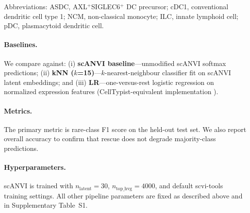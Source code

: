 Abbreviations: ASDC, AXL$^+$SIGLEC6$^+$ DC precursor; cDC1, conventional dendritic cell type 1; NCM, non-classical monocyte; ILC, innate lymphoid cell; pDC, plasmacytoid dendritic cell.

\paragraph{Baselines.} We compare against: (i) \textbf{scANVI baseline}---unmodified scANVI softmax predictions; (ii) \textbf{kNN ($k$=15)}---$k$-nearest-neighbour classifier fit on scANVI latent embeddings; and (iii) \textbf{LR}---one-versus-rest logistic regression on normalized expression features (CellTypist-equivalent implementation \citep{dominguez2022cross}).

\paragraph{Metrics.} The primary metric is rare-class F1 score on the held-out test set. We also report overall accuracy to confirm that rescue does not degrade majority-class predictions.

\paragraph{Hyperparameters.} scANVI is trained with $n_\text{latent} = 30$, $n_\text{top\_hvg} = 4000$, and default scvi-tools training settings. All other pipeline parameters are fixed as described above and in Supplementary Table~S1.
